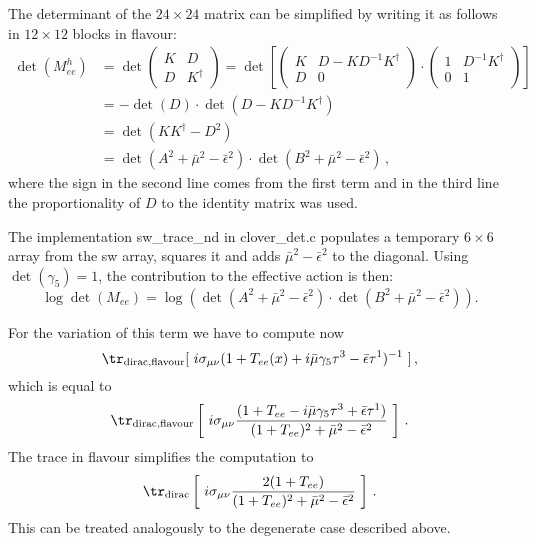 The determinant of the $24 \times 24$ matrix can be simplified by writing it as follows
in $12 \times 12$ blocks in flavour:
\begin{equation*}
	\begin{aligned}
	\det(M^h_{ee}) &= 
		\det 
			\begin{pmatrix}
				K & D \\
				D & K^\dagger
			\end{pmatrix} =
			\det \left[ \begin{pmatrix}
				K & D - K D^{-1} K^\dagger \\
				D & 0
			\end{pmatrix} \cdot
			\begin{pmatrix}
				1 & D^{-1} K^\dagger \\
				0 & 1
			\end{pmatrix} \right] \\
	&= - \det(D) \cdot \det( D - K D^{-1} K^\dagger ) \\
	&= \det( K K^\dagger - D^2 ) \\
	&= \det( A^2 + \bar{\mu}^2 - \bar{\epsilon}^2 ) \cdot \det( B^2 + \bar{\mu}^2 - \bar{\epsilon}^2 ) \,,
	\end{aligned}
\end{equation*}
where the sign in the second line comes from the first term and in the third line the
proportionality of $D$ to the identity matrix was used.

The implementation {\ttfamily sw\_trace\_nd} in {\ttfamily clover\_det.c} populates
a temporary $6\times6$ array from the {\ttfamily sw} array, squares it 
and adds $\bar{\mu}^2 - \bar{\epsilon}^2$ to the diagonal. Using $\det(\gamma_5) = 1$, 
the contribution to the effective action is then:
\begin{equation}
	\label{eq:cloverdet_nd}
		\log \det(M_{ee}) = \log\left( \det( A^2 + \bar{\mu}^2 - \bar{\epsilon}^2 ) \cdot \det( B^2 + \bar{\mu}^2 - \bar{\epsilon}^2 ) \right).
\end{equation}

For the variation of this term we have to compute now
\begin{equation}
  \label{eq:ndtrdiracdet}
  \tr_\mathrm{dirac, flavour}[\ i\sigma_{\mu\nu}(1+T_{ee}(x) +
  i\bar\mu\gamma_5\tau^3 - \bar\epsilon\tau^1)^{-1}\ ]\, ,
\end{equation}
which is equal to
\begin{equation}
 \tr_\mathrm{dirac,flavour}\left[\ i\sigma_{\mu\nu}
   \frac{(1+T_{ee}-i\bar\mu\gamma_5\tau^3+\bar\epsilon\tau^1)}
  {(1+T_{ee})^2 + \bar\mu^2 - \bar\epsilon^2}\ \right]\,.
\end{equation}
The trace in flavour simplifies the computation to
\begin{equation}
 \tr_\mathrm{dirac}\left[\ i\sigma_{\mu\nu}
   \frac{2(1+T_{ee})}
  {(1+T_{ee})^2 + \bar\mu^2 - \bar\epsilon^2}\ \right]\,.
\end{equation}
This can be treated analogously to the degenerate case described
above.

